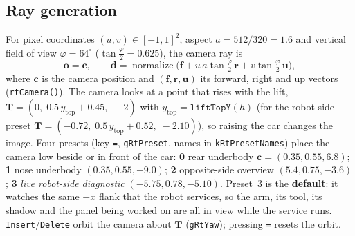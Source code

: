 \documentclass[10pt,a4paper]{article}
\newcommand{\fn}[1]{\texttt{#1}}
\newcommand{\vect}[1]{\mathbf{#1}}
\begin{document}
\subsection{Ray generation}
For pixel coordinates $(u,v)\in[-1,1]^2$, aspect $a=512/320=1.6$ and vertical field of view $\varphi=64^\circ$ ($\tan\frac{\varphi}{2}=0.625$), the camera ray is
\begin{equation}\vect o=\vect c,\qquad \vect d=\operatorname{normalize}\Big(\vect f+u\,a\tan\tfrac{\varphi}{2}\,\vect r+v\tan\tfrac{\varphi}{2}\,\vect{u}\Big),\label{eq:rtray}\end{equation}
where $\vect c$ is the camera position and $(\vect f,\vect r,\vect u)$ its forward, right and up vectors (\fn{rtCamera()}). The camera looks at a point that rises with the lift,
$\vect T=(0,\;0.5\,y_{\text{top}}+0.45,\;-2)$ with $y_{\text{top}}=\fn{liftTopY}(h)$ (for the robot-side preset $\vect T=(-0.72,\;0.5\,y_{\text{top}}+0.52,\;-2.10)$), so raising the car changes the image.
Four presets (key \fn{=}, \fn{gRtPreset}, names in \fn{kRtPresetNames}) place the camera low beside or in front of the car:
\textbf{0} rear underbody $\vect c=(0.35,0.55,6.8)$; \textbf{1} nose underbody $(0.35,0.55,-9.0)$; \textbf{2} opposite-side overview $(5.4,0.75,-3.6)$; \textbf{3} \emph{live robot-side diagnostic} $(-5.75,0.78,-5.10)$.
Preset~3 is the \textbf{default}: it watches the same $-x$ flank that the robot services, so the arm, its tool, its shadow and the panel being worked on are all in view while the service runs. \fn{Insert}/\fn{Delete} orbit the camera about $\vect T$ (\fn{gRtYaw}); pressing \fn{=} resets the orbit.
\end{document}
